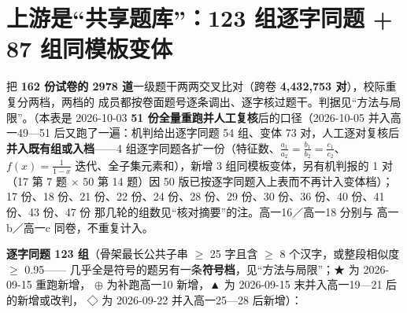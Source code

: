 \documentclass[a4paper,11pt]{article}
\begin{document}
\clearpage
\section{上游是``共享题库''：123 组逐字同题 + 87 组同模板变体}

把 \textbf{162 份试卷的 2978 道}一级题干两两交叉比对（跨卷 \textbf{4,432,753 对}），校际重复分两档，两档的
成员都按卷面题号逐条调出、逐字核过题干。判据见``方法与局限''。（本表是 2026-10-03
\textbf{51 份全量重跑并人工复核}后的口径（2026-10-05 并入高一49---51 后又跑了一遍：机判给出逐字同题 54 组、变体 73 对，人工逐对复核后\textbf{并入既有组或入档}------4 组逐字同题各扩一份（特征数、\(\frac{a_1}{a_2}=\frac{b_1}{b_2}=\frac{c_1}{c_2}\)、\(f(x)=\frac1{1-x}\) 迭代、全子集元素和），新增 3 组同模板变体，另有机判报的 1 对（17 第 7 题 $\times$ 50 第 14 题）因 50 版已按逐字同题入上表而不再计入变体档）；17 份、18 份、21 份、22 份、24 份、28 份、29 份、30 份、36 份、40 份、41 份、43 份、47 份
那几轮的组数见``核对摘要''的注。高一16／高一18 分别与 高一b／高一c 同卷，不重复计入。

\textbf{逐字同题 123 组}（骨架最长公共子串 $\geqslant$ 25 字且含 $\geqslant$ 8 个汉字，或整段相似度 $\geqslant$ 0.95------
几乎全是符号的题另有一条\textbf{符号档}，见``方法与局限''；★ 为 2026-09-15 重跑新增，
$\oplus$ 为补跑高一10 新增，▲ 为 2026-09-15 末并入高一19---21 后的新增或改判，
◇ 为 2026-09-22 并入高一25---28 后新增）：
\end{document}
